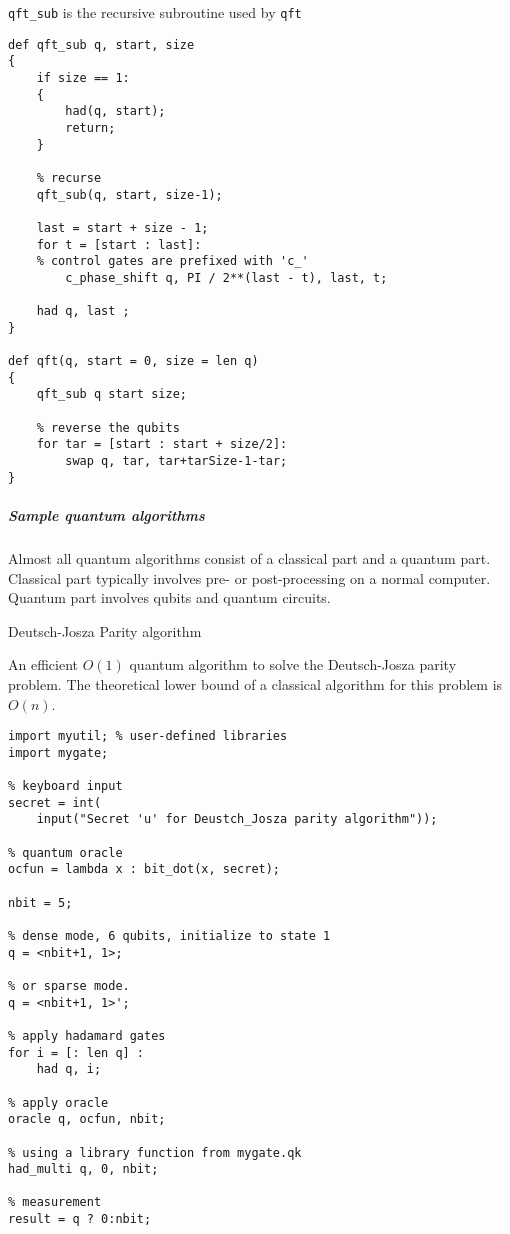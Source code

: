 \documentclass[]{article}
\begin{document}
\texttt{qft\_sub} is the recursive subroutine used by \texttt{qft}

\begin{verbatim}
def qft_sub q, start, size
{
    if size == 1:
    {
        had(q, start);
        return;
    }

    % recurse
    qft_sub(q, start, size-1);

    last = start + size - 1;
    for t = [start : last]:
    % control gates are prefixed with 'c_'
        c_phase_shift q, PI / 2**(last - t), last, t;

    had q, last ;
}

def qft(q, start = 0, size = len q)
{
    qft_sub q start size;

    % reverse the qubits
    for tar = [start : start + size/2]:
        swap q, tar, tar+tarSize-1-tar;
}
\end{verbatim}

\subparagraph{Sample quantum
algorithms}\label{sample-quantum-algorithms}

Almost all quantum algorithms consist of a classical part and a quantum
part. Classical part typically involves pre- or post-processing on a
normal computer. Quantum part involves qubits and quantum circuits.

Deutsch-Josza Parity algorithm

An efficient \(O(1)\) quantum algorithm to solve the Deutsch-Josza
parity problem. The theoretical lower bound of a classical algorithm for
this problem is \(O(n)\).

\begin{verbatim}
import myutil; % user-defined libraries
import mygate;

% keyboard input
secret = int(
    input("Secret 'u' for Deustch_Josza parity algorithm"));

% quantum oracle
ocfun = lambda x : bit_dot(x, secret);

nbit = 5;

% dense mode, 6 qubits, initialize to state 1
q = <nbit+1, 1>;

% or sparse mode. 
q = <nbit+1, 1>';

% apply hadamard gates
for i = [: len q] :
    had q, i;

% apply oracle
oracle q, ocfun, nbit;

% using a library function from mygate.qk
had_multi q, 0, nbit;

% measurement
result = q ? 0:nbit; 
\end{verbatim}
\end{document}
